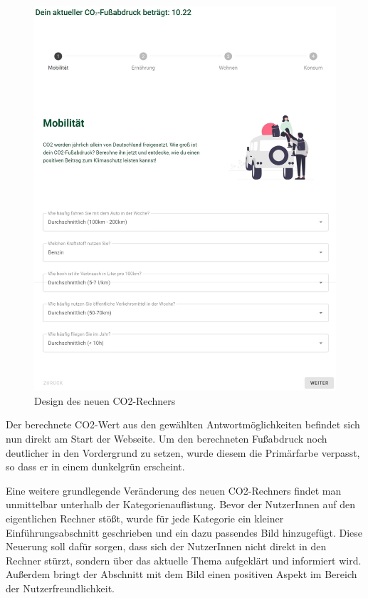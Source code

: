 \begin{figure}[H]
    \centering
    \includegraphics[width=1\textwidth]{images/06/Calculator-New-Design.jpeg}
    \caption{Design des neuen CO2-Rechners}
    \label{fig:new-co2runter-calculator-design}
\end{figure}

Der berechnete CO2-Wert aus den gewählten Antwortmöglichkeiten befindet sich nun direkt am Start der Webseite.
Um den berechneten Fußabdruck noch deutlicher in den Vordergrund zu setzen, wurde diesem die Primärfarbe verpasst, so dass er in einem dunkelgrün erscheint.

Eine weitere grundlegende Veränderung des neuen CO2-Rechners findet man unmittelbar unterhalb der Kategorienauflistung.
Bevor der NutzerInnen auf den eigentlichen Rechner stößt, wurde für jede Kategorie ein kleiner Einführungsabschnitt geschrieben und ein dazu passendes Bild hinzugefügt.
Diese Neuerung soll dafür sorgen, dass sich der NutzerInnen nicht direkt in den Rechner stürzt, sondern über das aktuelle Thema aufgeklärt und informiert wird.
Außerdem bringt der Abschnitt mit dem Bild einen positiven Aspekt im Bereich der Nutzerfreundlichkeit.

